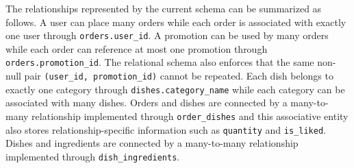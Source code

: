 The relationships represented by the current schema can be summarized as follows. A user can place many orders while each order is associated with exactly one user through \texttt{orders.user\_id}. A promotion can be used by many orders while each order can reference at most one promotion through \texttt{orders.promotion\_id}. The relational schema also enforces that the same non-null pair \texttt{(user\_id, promotion\_id)} cannot be repeated. Each dish belongs to exactly one category through \texttt{dishes.category\_name} while each category can be associated with many dishes. Orders and dishes are connected by a many-to-many relationship implemented through \texttt{order\_dishes} and this associative entity also stores relationship-specific information such as \texttt{quantity} and \texttt{is\_liked}. Dishes and ingredients are connected by a many-to-many relationship implemented through \texttt{dish\_ingredients}.
